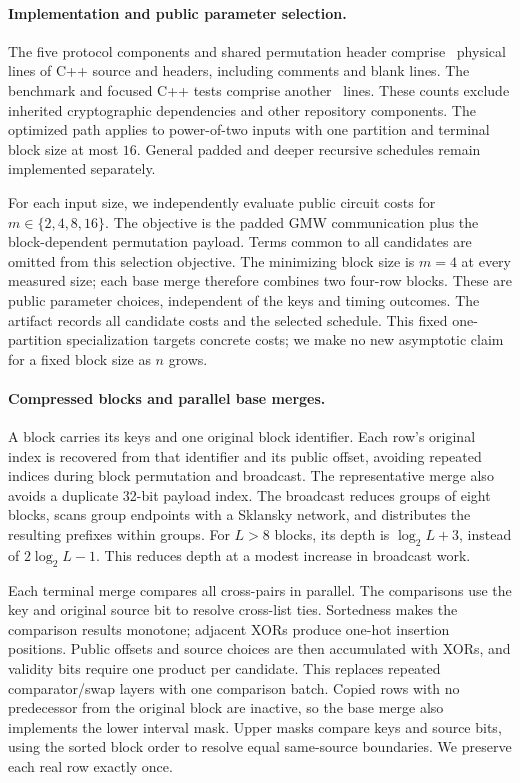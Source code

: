 \paragraph{Implementation and public parameter selection.}
The five protocol components and shared permutation header comprise
\packedLibraryLoc\ physical lines of
C++ source and headers, including comments and blank lines.
The benchmark and focused C++ tests comprise another \packedTestLoc\ lines.
These counts exclude inherited cryptographic dependencies and other repository
components. The optimized path applies to power-of-two inputs with one partition
and terminal block size at most $16$. General padded and deeper recursive schedules
remain implemented separately.

For each input size, we independently evaluate public circuit costs for
$m\in\{2,4,8,16\}$. The objective is the padded GMW communication plus the
block-dependent permutation payload. Terms common to all candidates are omitted
from this selection objective. The minimizing block size is $m=4$ at every
measured size; each base merge therefore combines two four-row blocks.
These are public parameter choices, independent of the keys and timing outcomes.
The artifact records all candidate costs and the selected schedule.
This fixed one-partition specialization targets concrete costs; we make no
new asymptotic claim for a fixed block size as $n$ grows.

\paragraph{Compressed blocks and parallel base merges.}
A block carries its keys and one original block identifier.
Each row's original index is recovered from that identifier and its public
offset, avoiding repeated indices during block permutation and broadcast.
The representative merge also avoids a duplicate 32-bit payload index.
The broadcast reduces groups of eight blocks, scans group endpoints with a
Sklansky network, and distributes the resulting prefixes within groups.
For $L>8$ blocks, its depth is $\log_2 L+3$, instead of $2\log_2 L-1$.
This reduces depth at a modest increase in broadcast work.

Each terminal merge compares all cross-pairs in parallel.
The comparisons use the key and original source bit to resolve cross-list ties.
Sortedness makes the comparison results monotone; adjacent XORs produce one-hot
insertion positions. Public offsets and source choices are then accumulated
with XORs, and validity bits require one product per candidate.
This replaces repeated comparator/swap layers with one comparison batch.
Copied rows with no predecessor from the original block are inactive, so the
base merge also implements the lower interval mask.
Upper masks compare keys and source bits, using the sorted block order to
resolve equal same-source boundaries. We preserve each real row exactly once.

